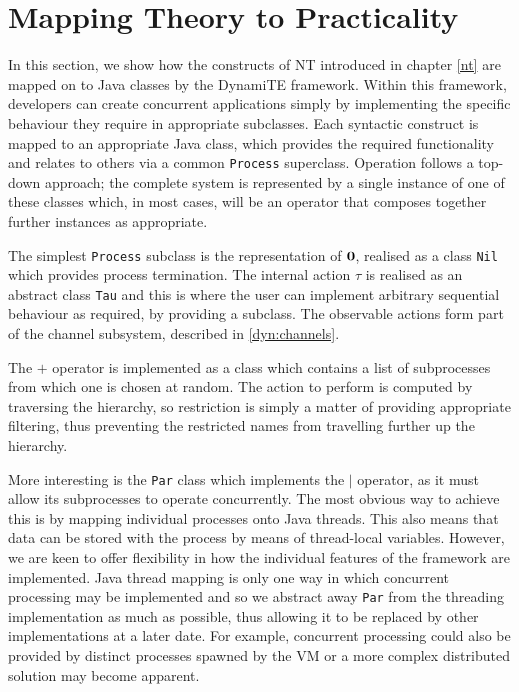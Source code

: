 \section{Mapping Theory to Practicality}
\label{dyn:maptheory}

In this section, we show how the constructs of NT introduced in
chapter \ref{nt} are mapped on to Java classes by the DynamiTE
framework.  Within this framework, developers can create concurrent
applications simply by implementing the specific behaviour they
require in appropriate subclasses.  Each syntactic construct is mapped
to an appropriate Java class, which provides the required
functionality and relates to others via a common \texttt{Process}
superclass.  Operation follows a top-down approach; the complete
system is represented by a single instance of one of these classes
which, in most cases, will be an operator that composes together
further instances as appropriate.

The simplest \texttt{Process} subclass is the representation of $\textbf{0}$,
realised as a class \texttt{Nil} which provides process termination.
The internal action $\tau$ is realised as an abstract class \texttt{Tau}
and this is where the user can implement arbitrary sequential behaviour
as required, by providing a subclass. The observable actions form part
of the channel subsystem, described in \ref{dyn:channels}.

The $+$ operator is implemented as a class which contains a list of
subprocesses from which one is chosen at random.  The action to perform
is computed by traversing the hierarchy, so restriction is simply a
matter of providing appropriate filtering, thus preventing the
restricted names from travelling further up the hierarchy.

More interesting is the \texttt{Par} class which implements the $\mid$
operator, as it must allow its subprocesses to operate concurrently.
The most obvious way to achieve this is by mapping individual processes
onto Java threads.  This also means that data can be stored with the
process by means of thread-local variables.  However, we are keen to
offer flexibility in how the individual features of the framework are
implemented.  Java thread mapping is only one way in which concurrent
processing may be implemented and so we abstract away \texttt{Par} from
the threading implementation as much as possible, thus allowing it to be
replaced by other implementations at a later date.  For example,
concurrent processing could also be provided by distinct processes
spawned by the VM or a more complex distributed solution may become
apparent.

